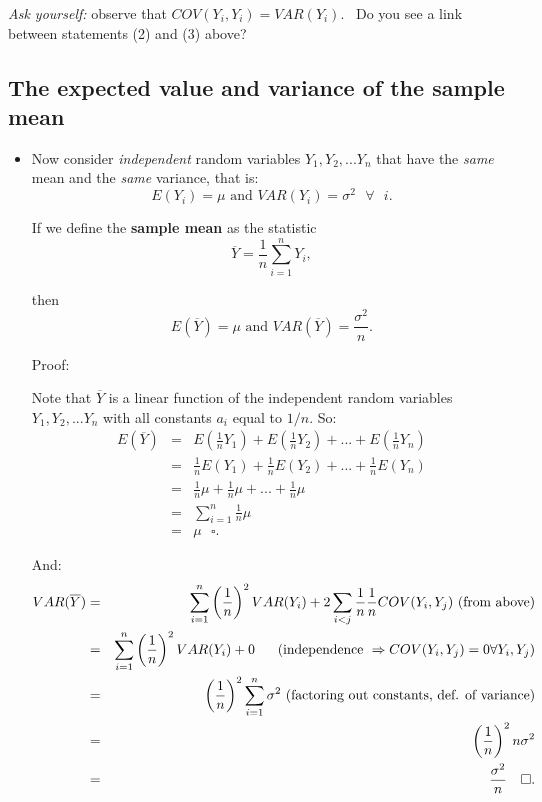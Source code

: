 \documentclass[11pt]{article}
\begin{document}
\textit{Ask yourself:} observe that $COV(Y_{i},Y_{i})=VAR(Y_{i})$. \ Do you
see a link between statements (2) and (3) above?\bigskip

\subsection{The expected value and variance of the sample mean\protect\bigskip}

\begin{itemize}
\item Now consider \textit{independent} random variables $%
Y_{1},Y_{2},...Y_{n}$ that have the \textit{same }mean and the \textit{same }%
variance, that is:%
\begin{equation*}
E(Y_{i})=\mu \text{ and }VAR(Y_{i})=\sigma ^{2}\text{ }\forall \text{ }i.
\end{equation*}

If we define the \textbf{sample mean} as the statistic%
\begin{equation*}
\overline{Y}=\frac{1}{n}\sum_{i=1}^{n}Y_{i},
\end{equation*}

then%
\begin{equation*}
E(\overline{Y})=\mu \text{ and }VAR(\overline{Y})=\frac{\sigma ^{2}}{n}.
\end{equation*}%
\newpage

Proof:

Note that $\overline{Y}$ is a linear function of the independent random
variables $Y_{1},Y_{2},...Y_{n}$ with all constants $a_{i}$ equal to $1/n.$
So:%
\begin{eqnarray*}
E(\overline{Y}) &=&E\left( \frac{1}{n}Y_{1}\right) +E\left( \frac{1}{n}%
Y_{2}\right) +...+E\left( \frac{1}{n}Y_{n}\right) \\
&=&\frac{1}{n}E(Y_{1})+\frac{1}{n}E(Y_{2})+...+\frac{1}{n}E(Y_{n}) \\
&=&\frac{1}{n}\mu +\frac{1}{n}\mu +...+\frac{1}{n}\mu \\
&=&\sum_{i=1}^{n}\frac{1}{n}\mu \\
&=&\mu \text{ \ \ }\square .
\end{eqnarray*}%
\bigskip

And:%
\begin{eqnarray*}
VAR(\overline{Y}) &=&\sum_{i=1}^{n}\left( \frac{1}{n}\right)
^{2}VAR(Y_{i})+2\sum_{i<j}\frac{1}{n}\frac{1}{n}COV(Y_{i},Y_{j})\text{ (from
above)} \\
&=&\sum_{i=1}^{n}\left( \frac{1}{n}\right) ^{2}VAR(Y_{i})+0\text{ \ \ \ \
(independence }\Rightarrow COV(Y_{i},Y_{j})=0\forall Y_{i},Y_{j}\text{)} \\
&=&\left( \frac{1}{n}\right) ^{2}\sum_{i=1}^{n}\sigma ^{2}\text{ (factoring
out constants, def. of variance)} \\
&=&\left( \frac{1}{n}\right) ^{2}n\sigma ^{2} \\
&=&\frac{\sigma ^{2}}{n}\text{ \ \ }\square .
\end{eqnarray*}
\end{itemize}
\end{document}
